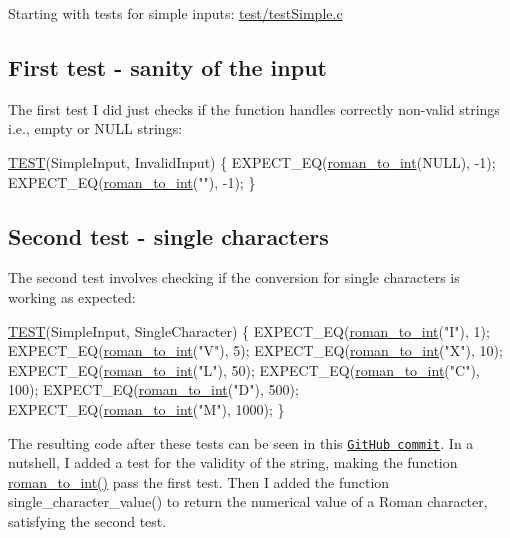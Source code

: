 Starting with tests for simple inputs\+: \hyperlink{test_simple_8c}{test/test\+Simple.\+c}

\subsection*{First test -\/ sanity of the input }

The first test I did just checks if the function handles correctly non-\/valid strings i.\+e., empty or N\+U\+LL strings\+:


\begin{DoxyCodeInclude}
\hyperlink{test_simple_8c_aff9fa977573ddab7597e233f1775d7c5}{TEST}(SimpleInput, InvalidInput) \{
    EXPECT\_EQ(\hyperlink{roman_8c_a5d15ad3ed29e4dc0fed9b718523c48c8}{roman\_to\_int}(NULL), -1);
    EXPECT\_EQ(\hyperlink{roman_8c_a5d15ad3ed29e4dc0fed9b718523c48c8}{roman\_to\_int}(\textcolor{stringliteral}{""}), -1);
\}
\end{DoxyCodeInclude}


\subsection*{Second test -\/ single characters }

The second test involves checking if the conversion for single characters is working as expected\+:


\begin{DoxyCodeInclude}
\hyperlink{test_simple_8c_aff9fa977573ddab7597e233f1775d7c5}{TEST}(SimpleInput, SingleCharacter) \{
    EXPECT\_EQ(\hyperlink{roman_8c_a5d15ad3ed29e4dc0fed9b718523c48c8}{roman\_to\_int}(\textcolor{stringliteral}{"I"}), 1);
    EXPECT\_EQ(\hyperlink{roman_8c_a5d15ad3ed29e4dc0fed9b718523c48c8}{roman\_to\_int}(\textcolor{stringliteral}{"V"}), 5);
    EXPECT\_EQ(\hyperlink{roman_8c_a5d15ad3ed29e4dc0fed9b718523c48c8}{roman\_to\_int}(\textcolor{stringliteral}{"X"}), 10);
    EXPECT\_EQ(\hyperlink{roman_8c_a5d15ad3ed29e4dc0fed9b718523c48c8}{roman\_to\_int}(\textcolor{stringliteral}{"L"}), 50);
    EXPECT\_EQ(\hyperlink{roman_8c_a5d15ad3ed29e4dc0fed9b718523c48c8}{roman\_to\_int}(\textcolor{stringliteral}{"C"}), 100);
    EXPECT\_EQ(\hyperlink{roman_8c_a5d15ad3ed29e4dc0fed9b718523c48c8}{roman\_to\_int}(\textcolor{stringliteral}{"D"}), 500);
    EXPECT\_EQ(\hyperlink{roman_8c_a5d15ad3ed29e4dc0fed9b718523c48c8}{roman\_to\_int}(\textcolor{stringliteral}{"M"}), 1000);
\}
\end{DoxyCodeInclude}
 The resulting code after these tests can be seen in this \href{https://github.com/diogenes1oliveira/libroman/commit/e9c1c6680af03fe397e5194c65434c857d4dd20d?diff=split#diff-3d6fc1bf772186c45fcd2c22d7ecd7b4}{\tt Git\+Hub commit}. In a nutshell, I added a test for the validity of the string, making the function {\ttfamily \hyperlink{roman_8c_a5d15ad3ed29e4dc0fed9b718523c48c8}{roman\+\_\+to\+\_\+int()}} pass the first test. Then I added the function {\ttfamily single\+\_\+character\+\_\+value()} to return the numerical value of a Roman character, satisfying the second test. 